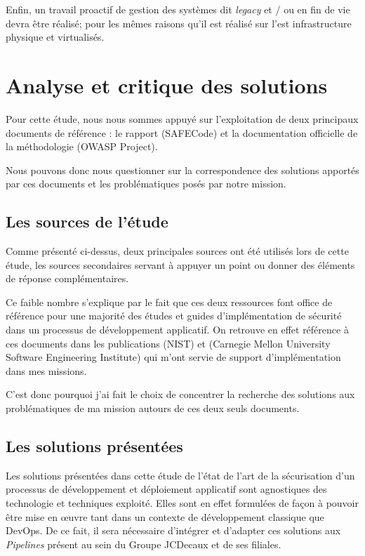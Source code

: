 Enfin, un travail proactif de gestion des systèmes dit \emph{legacy} et / ou en fin de vie devra être réalisé; pour les
mêmes raisons qu'il est réalisé sur l'est infrastructure physique et virtualisés.
 

\newpage

\section{Analyse et critique des solutions}

Pour cette étude, nous nous sommes appuyé sur l'exploitation de deux principaux documents de référence : le rapport 
 (SAFECode) et la documentation officielle de la méthodologie 
 (OWASP Project). 

Nous pouvons donc nous questionner sur la correspondence des solutions apportés par ces documents et les 
problématiques posés par notre mission.

\subsection{Les sources de l'étude}
Comme présenté ci-dessus, deux principales sources ont été utilisés lors de cette étude, les sources secondaires servant
à appuyer un point ou donner des éléments de réponse complémentaires.

Ce faible nombre s'explique par le fait que ces deux ressources font office de référence pour une majorité des études et 
guides d'implémentation de sécurité dans un processus de développement applicatif. On retrouve en effet référence à ces
documents dans les publications  (\ac{NIST}) et 
(Carnegie Mellon University Software Engineering Institute) qui m'ont servie de support d'implémentation dans mes missions.

C'est donc  pourquoi j'ai fait le choix de concentrer la recherche des solutions aux problématiques de ma mission autours
de ces deux seuls documents.

\subsection{Les solutions présentées}
Les solutions présentées dans cette étude de l'état de l'art de la sécurisation d'un processus de développement et 
déploiement applicatif sont agnostiques des technologie et techniques exploité. Elles sont en effet formulées de façon à
pouvoir être mise en œuvre tant dans un contexte de développement classique que DevOps.
\newline De ce fait, il sera nécessaire d'intégrer et d'adapter ces solutions aux \emph{Pipelines} présent au sein 
du Groupe JCDecaux et de ses filiales.

